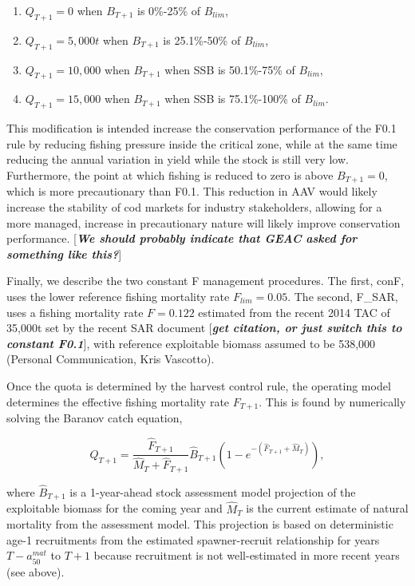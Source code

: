 \documentclass[12pt,]{article}
\providecommand{\tightlist}{%
  \setlength{\itemsep}{0pt}\setlength{\parskip}{0pt}}
\begin{document}
\begin{enumerate}
\def\labelenumi{\arabic{enumi}.}
\tightlist
\item
  \(Q_{T+1} = 0\) when \(B_{T+1}\) is 0\%-25\% of \(B_{lim}\),
\item
  \(Q_{T+1} = 5,000t\) when \(B_{T+1}\) is 25.1\%-50\% of \(B_{lim}\),
\item
  \(Q_{T+1} = 10,000\) when \(B_{T+1}\) when SSB is 50.1\%-75\% of
  \(B_{lim}\),
\item
  \(Q_{T+1} = 15,000\) when \(B_{T+1}\) when SSB is 75.1\%-100\% of
  \(B_{lim}\).
\end{enumerate}

This modification is intended increase the conservation performance of
the F0.1 rule by reducing fishing pressure inside the critical zone,
while at the same time reducing the annual variation in yield while the
stock is still very low. Furthermore, the point at which fishing is
reduced to zero is above \(B_{T+1} = 0\), which is more precautionary
than F0.1. This reduction in AAV would likely increase the stability of
cod markets for industry stakeholders, allowing for a more managed,
increase in precautionary nature will likely improve conservation
performance. {[}\textbf{\emph{We should probably indicate that GEAC
asked for something like this?}}{]}

Finally, we describe the two constant F management procedures. The
first, conF, uses the lower reference fishing mortality rate
\(F_{lim}= 0.05\). The second, F\_SAR, uses a fishing mortality rate
\(F= 0.122\) estimated from the recent 2014 TAC of 35,000t set by the
recent SAR document {[}\textbf{\emph{get citation, or just switch this
to constant F0.1}}{]}, with reference exploitable biomass assumed to be
538,000 (Personal Communication, Kris Vascotto).

Once the quota is determined by the harvest control rule, the operating
model determines the effective fishing mortality rate \(F_{T+1}\). This
is found by numerically solving the Baranov catch equation,

\begin{equation}
Q_{T+1} = \frac{\hat{F}_{T+1}}{\hat{M}_{T} + \hat{F}_{T+1}} \hat{B}_{T+1} \left(1 - e^{-(\hat{F}_{T+1} + \hat{M}_{T}) } \right),
\end{equation}

\noindent where \(\hat{B}_{T+1}\) is a 1-year-ahead stock assessment
model projection of the exploitable biomass for the coming year and
\(\hat{M}_T\) is the current estimate of natural mortality from the
assessment model. This projection is based on deterministic age-1
recruitments from the estimated spawner-recruit relationship for years
\(T - a_{50}^{mat}\) to \(T+1\) because recruitment is not
well-estimated in more recent years (see above).
\end{document}
